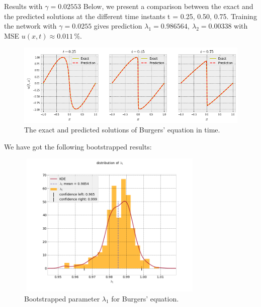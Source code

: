 \documentclass{beamer}
\begin{document}
\begin{frame}{Results with $\gamma=0.02553$}
Below, we present a comparison between the exact and the predicted solutions at the different time instants t = 0.25, 0.50, 0.75. Training the network with $\gamma=0.0255$ gives prediction $\lambda_1 =
0.986564, ~ \lambda_2 = 0.00338$ with MSE $u(x, t) \approx 0.011 \,\%$.

\begin{figure}
    \centering
    \includegraphics[scale=0.43]{images/burgers-exact-predict.png}
    \caption{The exact and predicted solutions of Burgers' equation in time.}
    \label{fig:burgers-exact-predict}
\end{figure}

\end{frame}

\begin{frame}{}

We have got the following bootstrapped results:
\begin{figure}
\centering
\includegraphics[width = 9cm , height = 7cm]{images/burgers-bootstraped_l1.png}
\caption{Bootstrapped parameter $\lambda_1$ for Burgers' equation.}
\end{figure}

\end{frame}
\end{document}
